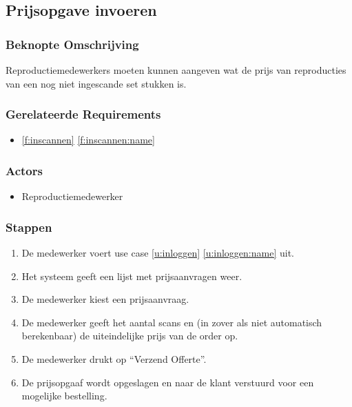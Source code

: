 \documentclass[a4paper,titlepage]{report}
\makeatletter
\def\namedlabel#1#2{
  \label{#1}
  \begingroup
   \def\@currentlabel{#2}%
   \label{#1:name}\endgroup
}
\def\namedref#1{\ref{#1} \ref{#1:name}}
\makeatother
\begin{document}
    \pagebreak
    \subsection{Prijsopgave invoeren}
    \namedlabel{u:prijsopgaaf}{Prijsopgave invoeren}
      \subsubsection{Beknopte Omschrijving}
        Reproductiemedewerkers moeten kunnen aangeven wat de prijs van
        reproducties van een nog niet ingescande set stukken is.
      \subsubsection{Gerelateerde Requirements}
        \begin{itemize}
          \item \namedref{f:inscannen}
        \end{itemize}
      \subsubsection{Actors}
        \begin{itemize}
          \item Reproductiemedewerker
        \end{itemize}
      \subsubsection{Stappen}
        \begin{enumerate}
          \item De medewerker voert use case \namedref{u:inloggen}
            uit.
          \item Het systeem geeft een lijst met prijsaanvragen weer.
          \item De medewerker kiest een prijsaanvraag.
          \item De medewerker geeft het aantal scans en (in zover als niet
          automatisch berekenbaar) de uiteindelijke prijs van de order op.
          \item De medewerker drukt op ``Verzend Offerte''.
          \item De prijsopgaaf wordt opgeslagen en naar de klant verstuurd
          voor een mogelijke bestelling.
        \end{enumerate}
\end{document}
